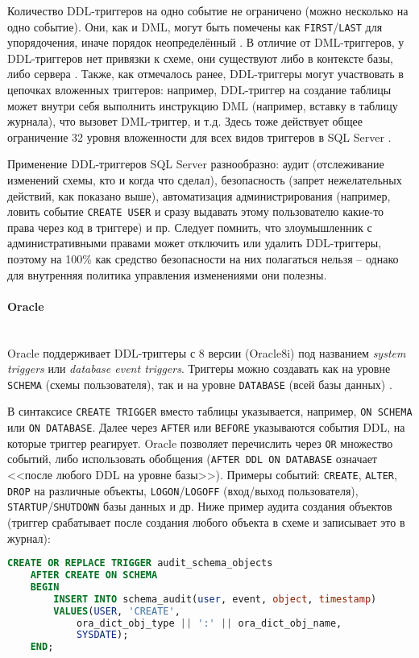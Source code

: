 Количество DDL-триггеров на одно событие не ограничено (можно несколько на одно событие). Они, как и DML, могут быть помечены как \texttt{FIRST}/\texttt{LAST} для упорядочения, иначе порядок неопределённый \autocite{MicrosoftLearnDDLTrig}. В отличие от DML-триггеров, у DDL-триггеров нет привязки к схеме, они существуют либо в контексте базы, либо сервера \autocite{MicrosoftLearnDDLTrig}. Также, как отмечалось ранее, DDL-триггеры могут участвовать в цепочках вложенных триггеров: например, DDL-триггер на создание таблицы может внутри себя выполнить инструкцию DML (например, вставку в таблицу журнала), что вызовет DML-триггер, и т.д. Здесь тоже действует общее ограничение 32 уровня вложенности для всех видов триггеров в SQL Server \autocite{MicrosoftLearnNestTrig}.

Применение DDL-триггеров SQL Server разнообразно: аудит (отслеживание изменений схемы, кто и когда что сделал), безопасность (запрет нежелательных действий, как показано выше), автоматизация администрирования (например, ловить событие \texttt{CREATE USER} и сразу выдавать этому пользователю какие-то права через код в триггере) и пр. Следует помнить, что злоумышленник с административными правами может отключить или удалить DDL-триггеры, поэтому на 100\% как средство безопасности на них полагаться нельзя – однако для внутренняя политика управления изменениями они полезны.

\paragraph{\textbf{Oracle}} ~\\

 Oracle поддерживает DDL-триггеры с 8 версии (Oracle8i) под названием \textit{system triggers} или \textit{database event triggers}. Триггеры можно создавать как на уровне \texttt{SCHEMA} (схемы пользователя), так и на уровне \texttt{DATABASE} (всей базы данных) \autocite{oracledbdoc7}. 
 
 В синтаксисе \texttt{CREATE TRIGGER} вместо таблицы указывается, например, \texttt{ON SCHEMA} или \texttt{ON DATABASE}. Далее через \texttt{AFTER} или \texttt{BEFORE} указываются события DDL, на которые триггер реагирует. Oracle позволяет перечислить через \texttt{OR} множество событий, либо использовать обобщения (\texttt{AFTER DDL ON DATABASE} означает <<после любого DDL на уровне базы>>). Примеры событий: \texttt{CREATE}, \texttt{ALTER}, \texttt{DROP} на различные объекты, \texttt{LOGON}/\texttt{LOGOFF} (вход/выход пользователя), \texttt{STARTUP}/\texttt{SHUTDOWN} базы данных и др. Ниже пример аудита создания объектов (триггер срабатывает после создания любого объекта в схеме и записывает это в журнал):
 \begin{lstlisting}[language=SQL]
    CREATE OR REPLACE TRIGGER audit_schema_objects
    AFTER CREATE ON SCHEMA
    BEGIN
        INSERT INTO schema_audit(user, event, object, timestamp)
        VALUES(USER, 'CREATE',
            ora_dict_obj_type || ':' || ora_dict_obj_name,
            SYSDATE);
    END;
 \end{lstlisting}

